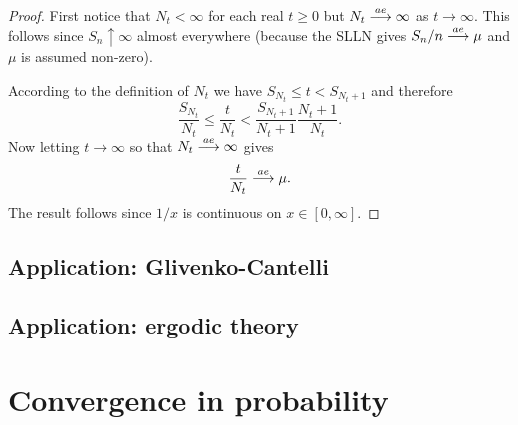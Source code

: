 \begin{proof}
First notice that $N_t<\infty$ for each real $t\geq 0$ but  $N_t\overset{\small ae} \longrightarrow \infty$ as $t \rightarrow \infty$. This follows since  $S_n\uparrow \infty$ almost everywhere (because the SLLN gives $S_n/n\overset{\small ae} \longrightarrow \mu$ and $\mu$ is assumed non-zero).


According to the definition of $N_t$ we have $S_{N_t}\leq t < S_{N_t+1}$ and therefore
\begin{equation}
\label{eq: renewal thm}
\frac{S_{N_t}}{N_t}\leq \frac{t}{N_t}< \frac{S_{N_t+1}}{N_t+1}\frac{N_t+1}{N_t}.
\end{equation}
Now  letting $t\rightarrow \infty$ so that $N_t\overset{\small ae} \longrightarrow \infty$ gives
\[
 \frac{t}{N_t} \overset{\small ae} \longrightarrow \mu.
\]
The result follows since $1/x$ is continuous on $x\in [0,\infty]$.

\end{proof}









\subsection{Application: Glivenko-Cantelli}

\subsection{Application: ergodic theory}







\clearpage
\section{Convergence in probability}





